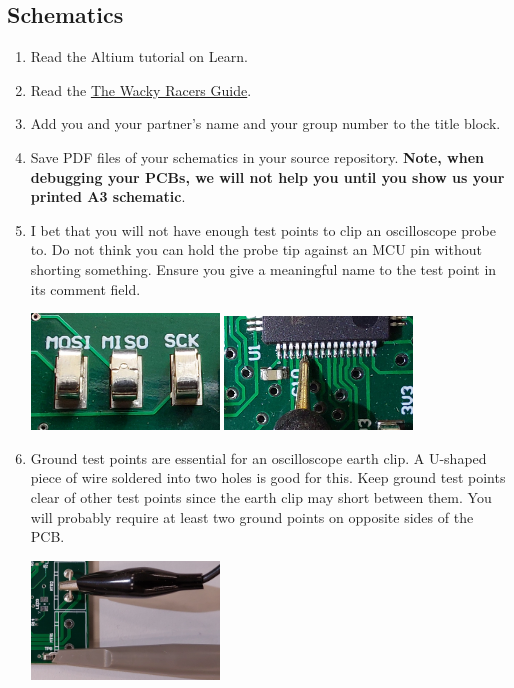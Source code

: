 \documentclass[11pt, a4paper]{article}
\newcommand{\theguide}{\href{https://eng-git.canterbury.ac.nz/wacky-racers/wacky-racers/-/blob/master/doc/guide/guide.pdf}{The Wacky Racers Guide}}
\begin{document}
\subsection{Schematics}

\begin{enumerate}
\item Read the Altium tutorial on Learn.

\item Read the \theguide.

\item Add you and your partner's name and your group number to the
  title block.

\item Save PDF files of your schematics in your source repository.
  \textbf{Note, when debugging your PCBs, we will not help you until
    you show us your printed A3 schematic}.

\item I bet that you will not have enough test points to clip an
  oscilloscope probe to.  Do not think you can hold the probe tip
  against an MCU pin without shorting something.  Ensure you give a
  meaningful name to the test point in its comment field.

  \includegraphics[width=5cm]{../guide/figs/testpoints.jpg}  \includegraphics[width=5cm]{../guide/figs/micro_probe_zoom.jpg}

\item Ground test points are essential for an oscilloscope earth clip.
  A U-shaped piece of wire soldered into two holes is good for this.
  Keep ground test points clear of other test points since the earth
  clip may short between them.  You will probably require at least two
  ground points on opposite sides of the PCB.

\includegraphics[width=5cm]{../guide/figs/scope_probe_testpoints.jpg}


\end{enumerate}
\end{document}
